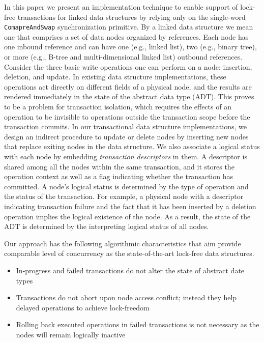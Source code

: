 \documentclass[10pt,conference,compsocconf]{IEEEtran}
\begin{document}
In this paper we present an implementation technique to enable support of lock-free transactions for linked data structures by relying only on the single-word \texttt{ComapreAndSwap} synchronization primitive.
By a linked data structure we mean one that comprises a set of data nodes organized by references. 
Each node has one inbound reference and can have one (e.g., linked list), two (e.g., binary tree), or more (e.g., B-tree and multi-dimensional linked list) outbound references.
Consider the three basic write operations one can perform on a node: insertion, deletion, and update.
In existing data structure implementations, these operations act directly on different fields of a physical node, and the results are rendered immediately in the state of the abstract data type (ADT).
This proves to be a problem for transaction isolation, which requires the effects of an operation to be invisible to operations outside the transaction scope before the transaction commits.
In our transactional data structure implementations, we design an indirect procedure to update or delete nodes by inserting new nodes that replace exiting nodes in the data structure.
We also associate a logical status with each node by embedding \emph{transaction descriptors} in them.
A descriptor is shared among all the nodes within the same transaction, and it stores the operation context as well as a flag indicating whether the transaction has committed.
A node's logical status is determined by the type of operation and the status of the transaction.
For example, a physical node with a descriptor indicating transaction failure and the fact that it has been inserted by a deletion operation implies the logical existence of the node.
As a result, the state of the ADT is determined by the interpreting logical status of all nodes.

Our approach has the following algorithmic characteristics that aim provide comparable level of concurrency as the state-of-the-art lock-free data structures.
\begin{itemize}
    \item In-progress and failed transactions do not alter the state of abstract date types
    \item Transactions do not abort upon node access conflict; instead they help delayed operations to achieve lock-freedom
    \item Rolling back executed operations in failed transactions is not necessary as the nodes will remain logically inactive
\end{itemize}
\end{document}
